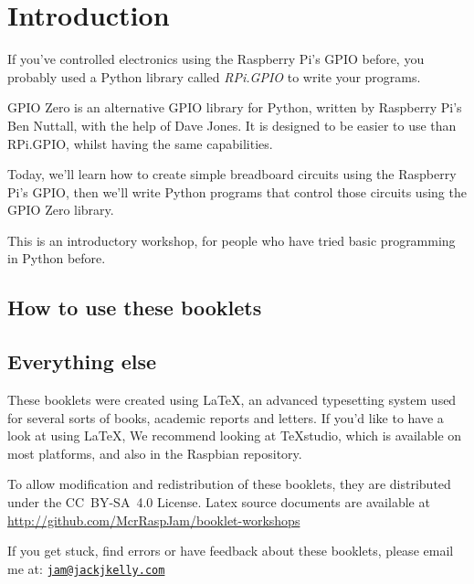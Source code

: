 \setcounter{section}{-1}
\section{Introduction}

	If you've controlled electronics using the Raspberry Pi's GPIO before, you probably used a Python library called \textit{RPi.GPIO} to write your programs.
	
	GPIO Zero is an alternative GPIO library for Python, written by Raspberry Pi's Ben Nuttall, with the help of Dave Jones. It is designed to be easier to use than RPi.GPIO, whilst having the same capabilities.

	Today, we'll learn how to create simple breadboard circuits using the Raspberry Pi's GPIO, then we'll write Python programs that control those circuits using the GPIO Zero library.

	This is an introductory workshop, for people who have tried basic programming in Python before.
		
	\subsection*{How to use these booklets}

	
	
	
	
	
	
	
	\subsection*{Everything else}
	
		These booklets were created using \textrm{\LaTeX}, an advanced typesetting system used for several sorts of books, academic reports and letters.
		\ifprint\else
			If you'd like to have a look at using LaTeX, We recommend looking at \TeX studio, which is available on most platforms, and also in the Raspbian repository.
		\fi
		
		
		To allow modification and redistribution of these booklets, they are distributed under the \hbox{CC BY-SA 4.0} License.
		Latex source documents are available at \url{http://github.com/McrRaspJam/booklet-workshops}
		
		If you get stuck, find errors or have feedback about these booklets, please email me at:
		\href{mailto:jam@jackjkelly.com}{\texttt{jam@jackjkelly.com}}
